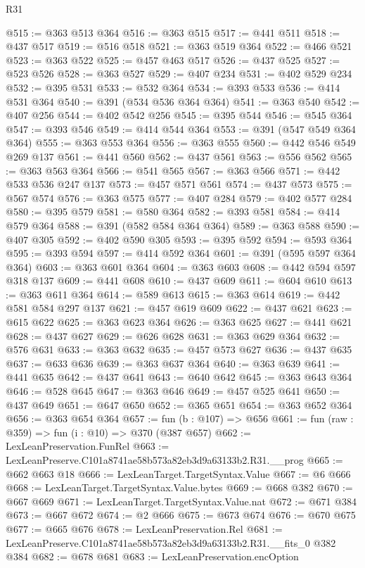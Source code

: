 \begin{lexlean}{R31}
\begin{coremodule}
@515 := @363 @513 @364
@516 := @363 @515
@517 := @441 @511
@518 := @437 @517
@519 := @516 @518
@521 := @363 @519 @364
@522 := @466 @521
@523 := @363 @522
@525 := @457 @463 @517
@526 := @437 @525
@527 := @523 @526
@528 := @363 @527
@529 := @407 @234
@531 := @402 @529 @234
@532 := @395 @531
@533 := @532 @364
@534 := @393 @533
@536 := @414 @531 @364
@540 := @391 (@534 @536 @364 @364)
@541 := @363 @540
@542 := @407 @256
@544 := @402 @542 @256
@545 := @395 @544
@546 := @545 @364
@547 := @393 @546
@549 := @414 @544 @364
@553 := @391 (@547 @549 @364 @364)
@555 := @363 @553 @364
@556 := @363 @555
@560 := @442 @546 @549 @269 @137
@561 := @441 @560
@562 := @437 @561
@563 := @556 @562
@565 := @363 @563 @364
@566 := @541 @565
@567 := @363 @566
@571 := @442 @533 @536 @247 @137
@573 := @457 @571 @561
@574 := @437 @573
@575 := @567 @574
@576 := @363 @575
@577 := @407 @284
@579 := @402 @577 @284
@580 := @395 @579
@581 := @580 @364
@582 := @393 @581
@584 := @414 @579 @364
@588 := @391 (@582 @584 @364 @364)
@589 := @363 @588
@590 := @407 @305
@592 := @402 @590 @305
@593 := @395 @592
@594 := @593 @364
@595 := @393 @594
@597 := @414 @592 @364
@601 := @391 (@595 @597 @364 @364)
@603 := @363 @601 @364
@604 := @363 @603
@608 := @442 @594 @597 @318 @137
@609 := @441 @608
@610 := @437 @609
@611 := @604 @610
@613 := @363 @611 @364
@614 := @589 @613
@615 := @363 @614
@619 := @442 @581 @584 @297 @137
@621 := @457 @619 @609
@622 := @437 @621
@623 := @615 @622
@625 := @363 @623 @364
@626 := @363 @625
@627 := @441 @621
@628 := @437 @627
@629 := @626 @628
@631 := @363 @629 @364
@632 := @576 @631
@633 := @363 @632
@635 := @457 @573 @627
@636 := @437 @635
@637 := @633 @636
@639 := @363 @637 @364
@640 := @363 @639
@641 := @441 @635
@642 := @437 @641
@643 := @640 @642
@645 := @363 @643 @364
@646 := @528 @645
@647 := @363 @646
@649 := @457 @525 @641
@650 := @437 @649
@651 := @647 @650
@652 := @365 @651
@654 := @363 @652 @364
@656 := @363 @654 @364
@657 := fun (b : @107) => @656
@661 := fun (raw : @359) => fun (i : @10) => @370 (@387 @657)
@662 := LexLeanPreservation.FunRel
@663 := LexLeanPreserve.C101a8741ae58b573a82eb3d9a63133b2.R31.__prog
@665 := @662 @663 @18
@666 := LexLeanTarget.TargetSyntax.Value
@667 := @6 @666
@668 := LexLeanTarget.TargetSyntax.Value.bytes
@669 := @668 @382
@670 := @667 @669
@671 := LexLeanTarget.TargetSyntax.Value.nat
@672 := @671 @384
@673 := @667 @672
@674 := @2 @666
@675 := @673 @674
@676 := @670 @675
@677 := @665 @676
@678 := LexLeanPreservation.Rel
@681 := LexLeanPreserve.C101a8741ae58b573a82eb3d9a63133b2.R31.__fits_0 @382 @384
@682 := @678 @681
@683 := LexLeanPreservation.encOption

\end{coremodule}
\end{lexlean}
